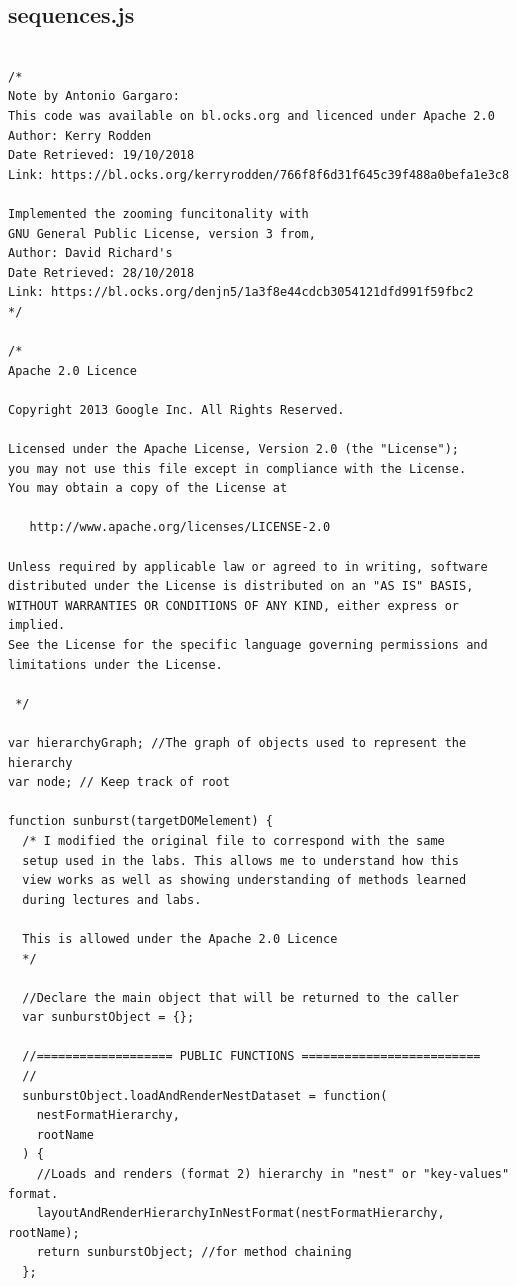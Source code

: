 \documentclass[a4paper, 11pt]{article}
\begin{document}
\newpage
\subsection{sequences.js}

\begin{verbatim}
    
/*
Note by Antonio Gargaro:
This code was available on bl.ocks.org and licenced under Apache 2.0
Author: Kerry Rodden
Date Retrieved: 19/10/2018
Link: https://bl.ocks.org/kerryrodden/766f8f6d31f645c39f488a0befa1e3c8

Implemented the zooming funcitonality with
GNU General Public License, version 3 from,
Author: David Richard's
Date Retrieved: 28/10/2018
Link: https://bl.ocks.org/denjn5/1a3f8e44cdcb3054121dfd991f59fbc2
*/

/*
Apache 2.0 Licence

Copyright 2013 Google Inc. All Rights Reserved.

Licensed under the Apache License, Version 2.0 (the "License");
you may not use this file except in compliance with the License.
You may obtain a copy of the License at

   http://www.apache.org/licenses/LICENSE-2.0

Unless required by applicable law or agreed to in writing, software
distributed under the License is distributed on an "AS IS" BASIS,
WITHOUT WARRANTIES OR CONDITIONS OF ANY KIND, either express or implied.
See the License for the specific language governing permissions and
limitations under the License.

 */

var hierarchyGraph; //The graph of objects used to represent the hierarchy
var node; // Keep track of root

function sunburst(targetDOMelement) {
  /* I modified the original file to correspond with the same
  setup used in the labs. This allows me to understand how this
  view works as well as showing understanding of methods learned
  during lectures and labs.

  This is allowed under the Apache 2.0 Licence
  */

  //Declare the main object that will be returned to the caller
  var sunburstObject = {};

  //=================== PUBLIC FUNCTIONS =========================
  //
  sunburstObject.loadAndRenderNestDataset = function(
    nestFormatHierarchy,
    rootName
  ) {
    //Loads and renders (format 2) hierarchy in "nest" or "key-values" format.
    layoutAndRenderHierarchyInNestFormat(nestFormatHierarchy, rootName);
    return sunburstObject; //for method chaining
  };


\end{verbatim}
\end{document}
